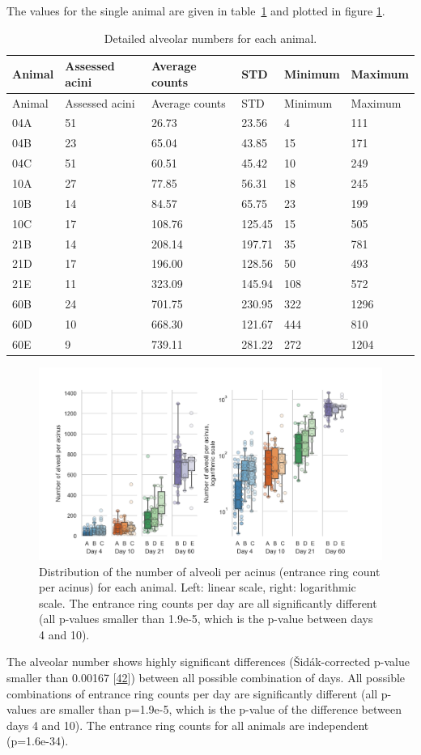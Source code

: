 \documentclass[
  american,
]{article}
\begin{document}
The values for the single animal are given in table~\ref{tbl:counts} and plotted in figure \ref{fig:02}.

\begin{longtable}[]{@{}llllll@{}}
\caption{Detailed alveolar numbers for each animal. \label{tbl:counts}}\tabularnewline
\toprule
Animal & Assessed acini & Average counts & STD & Minimum & Maximum\tabularnewline
\midrule
\endfirsthead
\toprule
Animal & Assessed acini & Average counts & STD & Minimum & Maximum\tabularnewline
\midrule
\endhead
04A & 51 & 26.73 & 23.56 & 4 & 111\tabularnewline
04B & 23 & 65.04 & 43.85 & 15 & 171\tabularnewline
04C & 51 & 60.51 & 45.42 & 10 & 249\tabularnewline
10A & 27 & 77.85 & 56.31 & 18 & 245\tabularnewline
10B & 14 & 84.57 & 65.75 & 23 & 199\tabularnewline
10C & 17 & 108.76 & 125.45 & 15 & 505\tabularnewline
21B & 14 & 208.14 & 197.71 & 35 & 781\tabularnewline
21D & 17 & 196.00 & 128.56 & 50 & 493\tabularnewline
21E & 11 & 323.09 & 145.94 & 108 & 572\tabularnewline
60B & 24 & 701.75 & 230.95 & 322 & 1296\tabularnewline
60D & 10 & 668.30 & 121.67 & 444 & 810\tabularnewline
60E & 9 & 739.11 & 281.22 & 272 & 1204\tabularnewline
\bottomrule
\end{longtable}

\begin{figure}
\hypertarget{fig:02}{%
\centering
\includegraphics{images/fig02.png}
\caption{Distribution of the number of alveoli per acinus (entrance ring count per acinus) for each animal.
Left: linear scale, right: logarithmic scale.
The entrance ring counts per day are all significantly different (all p-values smaller than 1.9e-5, which is the p-value between days 4 and 10).}\label{fig:02}
}
\end{figure}

The alveolar number shows highly significant differences (Šidák-corrected p-value smaller than 0.00167 {[}\protect\hyperlink{ref-GtCynqsI}{42}{]}) between all possible combination of days.
All possible combinations of entrance ring counts per day are significantly different (all p-values are smaller than p=1.9e-5, which is the p-value of the difference between days 4 and 10).
The entrance ring counts for all animals are independent (p=1.6e-34).
\end{document}
